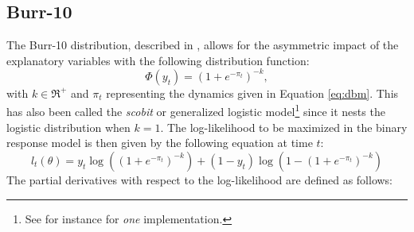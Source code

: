\subsection{Burr-10}
The Burr-10 distribution, described in \cite{Nagler1994}, allows for the asymmetric impact of the explanatory variables with the following distribution function:
\begin{equation}
\Phi \left( {{y_t}} \right) = {\left( {1 + {e^{ - {\pi_t}}}} \right)^{ - k}},
\end{equation}
with $k \in {\Re ^ + }$ and $\pi_t$ representing the dynamics given in Equation \ref{eq:dbm}. This has also been called the \emph{scobit} or generalized logistic model\footnote{See for instance \cite{Zeileis2011} for \emph{one} implementation.} since it nests the logistic distribution when $k=1$. The log-likelihood to be maximized in the binary response model is then given by the following equation at time $t$:
\begin{equation}
{l_t}\left( \theta  \right) = {y_t}\log \left( {{{\left( {1 + {e^{ - {\pi _t}}}} \right)}^{ - k}}} \right) + \left( {1 - {y_t}} \right)\log \left( {1 - {{\left( {1 + {e^{ - {\pi _t}}}} \right)}^{ - k}}} \right)
\end{equation}
The partial derivatives with respect to the log-likelihood are defined as follows:
